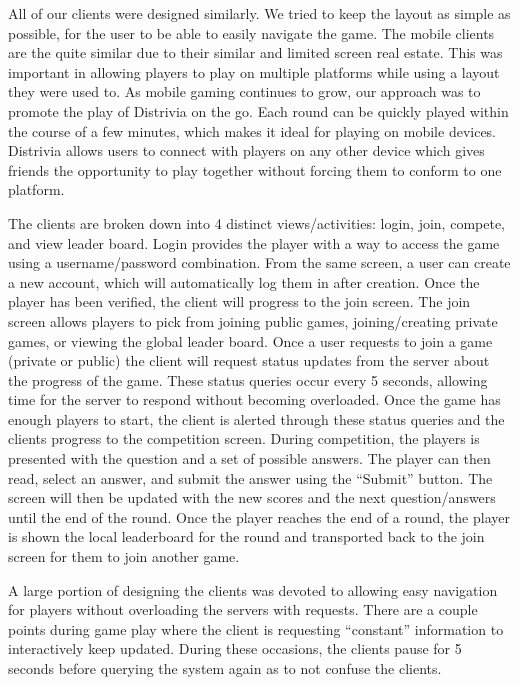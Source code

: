 \documentclass{dependencies/acm_proc_article-sp}
\begin{document}
All of our clients were designed similarly.
We tried to keep the layout as simple as possible, for the user to be able to easily navigate the game.
The mobile clients are the quite similar due to their similar and limited screen real estate.
This was important in allowing players to play on multiple platforms while using a layout they were used to.
As mobile gaming continues to grow, our approach was to promote the play of Distrivia on the go.
Each round can be quickly played within the course of a few minutes, which makes it ideal for playing on mobile devices.
Distrivia allows users to connect with players on any other device which gives friends the opportunity to play together without forcing them to conform to one platform.

The clients are broken down into 4 distinct views/activities: login, join, compete, and view leader board. 
Login provides the player with a way to access the game using a username/password combination.  From the same screen, a user can create a new account, which will automatically log them in after creation.
Once the player has been verified, the client will progress to the join screen. 
The join screen allows players to pick from joining public games, joining/creating private games, or viewing the global leader board. 
Once a user requests to join a game (private or public) the client will request status updates from the server about the progress of the game.
These status queries occur every 5 seconds, allowing time for the server to respond without becoming overloaded. 
Once the game has enough players to start, the client is alerted through these status queries and the clients progress to the competition screen.
During competition, the players is presented with the question and a set of possible answers.
The player can then read, select an answer, and submit the answer using the “Submit” button.
The screen will then be updated with the new scores and the next question/answers until the end of the round.
Once the player reaches the end of a round, the player is shown the local leaderboard for the round and transported back to the join screen for them to join another game.

A large portion of designing the clients was devoted to allowing easy navigation for players without overloading the servers with requests.
There are a couple points during game play where the client is requesting “constant” information to interactively keep updated.
During these occasions, the clients pause for 5 seconds before querying the system again as to not confuse the clients.
\end{document}
